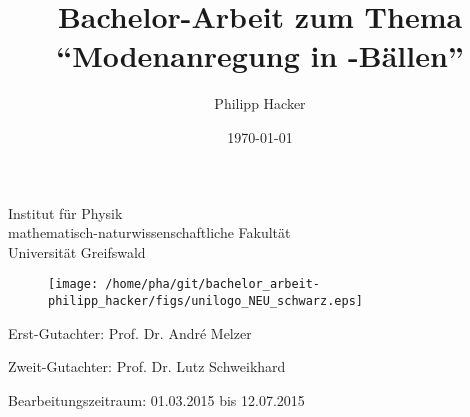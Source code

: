 \documentclass[numbers=noenddot,a4paper]{scrartcl}
\title{Bachelor-Arbeit zum Thema \enquote{Modenanregung in \tilt{Yukawa}-Bällen}} %
\author{Philipp Hacker} %
\date{\today}
\begin{document}
	
	\maketitle
	
	\begin{center}
		
		Institut für Physik\\
		mathematisch-naturwissenschaftliche Fakultät\\
		Universität Greifswald
		
	\end{center}
	 
	\vspace{0.5cm}
	
	\begin{figure}[H]
			\centering
			\texttt{[image: /home/pha/git/bachelor\_arbeit-philipp\_hacker/figs/unilogo\_NEU\_schwarz.eps]}
	\end{figure}
	
	\vspace{0.5cm}
	
	\begin{center}
			
			\hspace{-0.55cm} Erst-Gutachter: Prof. Dr. André Melzer \\ \vspace{0.25cm} %
			
			Zweit-Gutachter: Prof. Dr. Lutz Schweikhard \\ \vspace{0.25cm} %
			
			Bearbeitungszeitraum: 01.03.2015 bis 12.07.2015 \\ \vspace{0.25cm} %
		
%			
%			

	\end{center}
	
\end{document}
